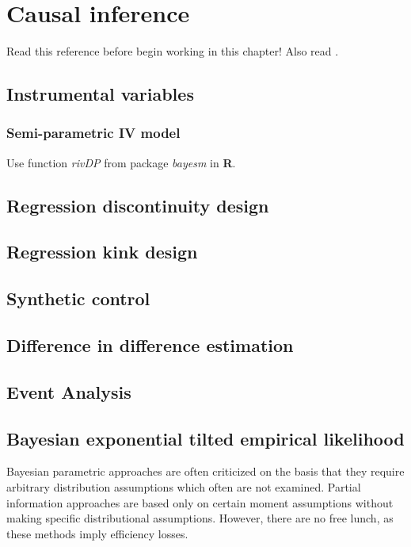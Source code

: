 \chapter{Causal inference}\label{chap12}

Read this reference \cite{iacovone2023bayesian} before begin working in this chapter! Also read \cite{imbens1997bayesian}.
\section{Instrumental variables}\label{sec12_1}
\subsection{Semi-parametric IV model}\label{sec12_11}
Use function \textit{rivDP} from package \textit{bayesm} in \textbf{R}.

\section{Regression discontinuity design}\label{sec12_2}

\section{Regression kink design}\label{sec12_3}

\section{Synthetic control}\label{sec12_4}

\section{Difference in difference estimation}\label{sec12_5}

\section{Event Analysis}\label{sec12_6}

\section{Bayesian exponential tilted empirical likelihood}\label{sec12_7}
Bayesian parametric approaches are often criticized on the basis that they require arbitrary distribution assumptions which often are not examined. Partial information approaches are based only on certain moment assumptions without making specific distributional assumptions. However, there are no free lunch, as these methods imply efficiency losses.

